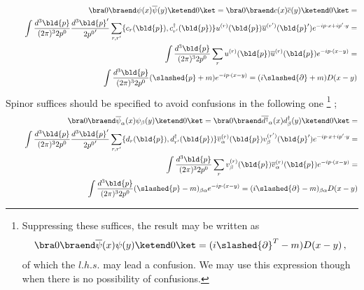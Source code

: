 \begin{eqnarray}
&&
\vspace{2mm}
 \bra 0 \braend \psi(x) \overline{\psi}(y) \ketend 0 \ket 
=
\bra 0 \braend c(x) \overline{c}(y) \ketend 0 \ket =
\nonumber\\
&&
\hspace{5mm} 
 \int \frac{d^3 \bld{p}}{(2\pi)^3 2 p^0} \frac{d^3 \bld{p}'}{2 {p^0}'}
\sum_{r, r'} 
\{ c_r(\bld{p}), c^\dagger_{r'}(\bld{p}) \}
u^{(r)}(\bld{p}) \overline{u}^{(r')}(\bld{p}') e^{-ip \cdot x + ip' \cdot y} =
\nonumber\\
&&
\hspace{9mm} 
 \int \frac{d^3 \bld{p}}{(2\pi)^3 2 p^0} 
\sum_{r} 
u^{(r)}(\bld{p}) \overline{u}^{(r)}(\bld{p}) e^{-ip \cdot ( x - y)} =
\nonumber\\
&&
\hspace{13mm} 
 \int \frac{d^3 \bld{p}}{(2\pi)^3 2 p^0} 
(\slashed{p} + m)  e^{-ip \cdot ( x - y)} =
(i \slashed{\partial} + m) D(x - y)
\end{eqnarray}
Spinor suffices should be specified to avoid confusions in the following one
\footnote{%
Suppressing these suffices, the result may be written as
\begin{eqnarray}
\bra 0 \braend \overline{\psi}(x)  \psi(y) \ketend 0 \ket
=
(i \slashed{\partial}^T - m) D(x - y)\,,
\end{eqnarray}
of which the $l.h.s.$ may lead a confusion.
We may use this expression though when there is no possibility of confusions.
}%
;
\begin{eqnarray}
&&\bra 0 \braend \overline{\psi}_\alpha(x)  \psi_\beta(y) \ketend 0 \ket
=
\bra 0 \braend \overline{d^\dagger}_\alpha(x)  d_\beta^\dagger(y) \ketend 0 \ket =
\nonumber\\
&&
\hspace{5mm} 
\int \frac{d^3 \bld{p}}{(2\pi)^3 2 p^0} \frac{d^3 \bld{p}'}{2 {p^0}'}
\sum_{r, r'} 
\{ d_r(\bld{p}), d^\dagger_{r'}(\bld{p}) \}
\overline{v}_\alpha^{(r)}(\bld{p}) v_\beta^{(r')}(\bld{p}')
 e^{-ip \cdot x + ip' \cdot y} =
\nonumber\\
&&
\hspace{9mm} 
\int \frac{d^3 \bld{p}}{(2\pi)^3 2 p^0} 
\sum_{r} 
 v_\beta^{(r)}(\bld{p}) \overline{v}_\alpha^{(r)}(\bld{p})
e^{-ip \cdot ( x - y)} =
\nonumber\\
&&
\hspace{13mm} 
\int \frac{d^3 \bld{p}}{(2\pi)^3 2 p^0} 
(\slashed{p} - m)_{\beta \alpha}  e^{-ip \cdot ( x - y)} =
(i \slashed{\partial} - m)_{\beta \alpha} D(x - y)
\end{eqnarray}
